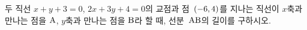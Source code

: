 두 직선 $x+y+3=0$, $2x+3y+4=0$의 교점과 점~$(-6{,}\mkern3mu\mathopen{}4)$를 지나는 직선이 $x$축과 만나는 점을 $\mathrm{A}$, $y$축과 만나는 점을 $\mathrm{B}$라 할 때, 선분~$\mathrm{AB}$의 길이를 구하시오.
